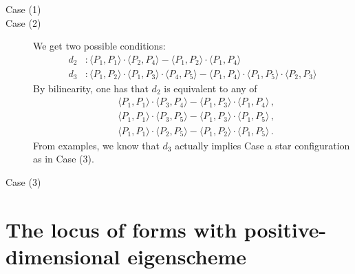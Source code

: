 \documentclass[11pt, a4paper, reqno, captions=tableheading,bibliography=totoc]{scrartcl}
\theoremstyle{plain}
\theoremstyle{definition}
\begin{document}
\begin{description}
 \item[Case (1)]
 \item[Case (2)]
 We get two possible conditions:
 \begin{align}
  d_2 &: \langle P_1, P_1 \rangle\cdot \langle P_2, P_4\rangle -
  \langle P_1, P_2 \rangle \cdot \langle P_1, P_4 \rangle \label{rango9_1} \\
  d_3 &: \langle P_1,P_2 \rangle \cdot \langle P_1,P_3\rangle \cdot
  \langle P_4,P_5\rangle -\langle P_1,P_4\rangle \cdot \langle P_1,P_5\rangle
  \cdot \langle P_2,P_3\rangle  \label{rango9_2}
\end{align}
By bilinearity, one has that $d_2$ is equivalent to any of
\begin{equation}
\begin{aligned}
    & \langle P_1, P_1 \rangle\cdot \langle P_3, P_4\rangle -
  \langle P_1, P_3 \rangle \cdot \langle P_1, P_4 \rangle \,, \\
    & \langle P_1, P_1 \rangle\cdot \langle P_3, P_5\rangle -
  \langle P_1, P_3 \rangle \cdot \langle P_1, P_5 \rangle \,, \\
    & \langle P_1, P_1 \rangle\cdot \langle P_2, P_5\rangle -
  \langle P_1, P_2 \rangle \cdot \langle P_1, P_5 \rangle \,.
\end{aligned}
\end{equation}
From examples, we know that $d_3$ actually implies Case a star configuration as in Case (3).
 \item[Case (3)]

\end{description}

\section{The locus of forms with positive-dimensional eigenscheme}
\end{document}
